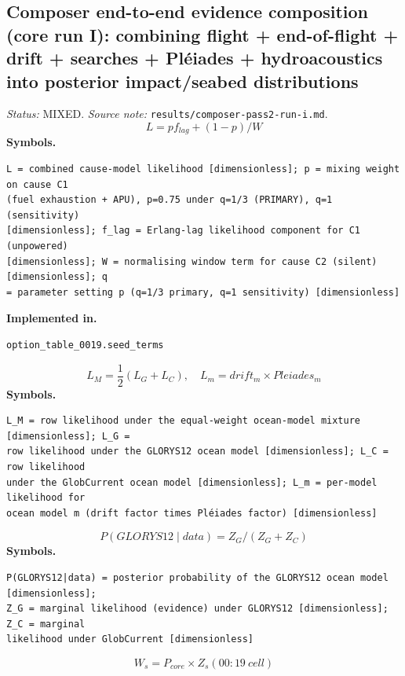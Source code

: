 \documentclass[11pt,a4paper]{article}
\begin{document}
\subsection{Composer end-to-end evidence composition (core run I): combining flight + end-of-flight + drift + searches + Pléiades + hydroacoustics into posterior impact/seabed distributions}
\noindent\textit{Status:} MIXED. \textit{Source note:} \texttt{results/composer-pass2-run-i.md}.
\medskip
\begin{equation}
L = p f_{lag} + (1-p)/W
\end{equation}
\noindent\textbf{Symbols.}
\begin{verbatim}
L = combined cause-model likelihood [dimensionless]; p = mixing weight on cause C1
(fuel exhaustion + APU), p=0.75 under q=1/3 (PRIMARY), q=1 (sensitivity)
[dimensionless]; f_lag = Erlang-lag likelihood component for C1 (unpowered)
[dimensionless]; W = normalising window term for cause C2 (silent) [dimensionless]; q
= parameter setting p (q=1/3 primary, q=1 sensitivity) [dimensionless]
\end{verbatim}
\noindent\textbf{Implemented in.}
\begin{verbatim}
option_table_0019.seed_terms
\end{verbatim}
\medskip
\begin{equation}
L_M = \frac{1}{2}(L_G + L_C),\quad L_m = drift_m \times Pleiades_m
\end{equation}
\noindent\textbf{Symbols.}
\begin{verbatim}
L_M = row likelihood under the equal-weight ocean-model mixture [dimensionless]; L_G =
row likelihood under the GLORYS12 ocean model [dimensionless]; L_C = row likelihood
under the GlobCurrent ocean model [dimensionless]; L_m = per-model likelihood for
ocean model m (drift factor times Pléiades factor) [dimensionless]
\end{verbatim}
\medskip
\begin{equation}
P(GLORYS12 \mid data) = Z_G / (Z_G + Z_C)
\end{equation}
\noindent\textbf{Symbols.}
\begin{verbatim}
P(GLORYS12|data) = posterior probability of the GLORYS12 ocean model [dimensionless];
Z_G = marginal likelihood (evidence) under GLORYS12 [dimensionless]; Z_C = marginal
likelihood under GlobCurrent [dimensionless]
\end{verbatim}
\medskip
\begin{equation}
W_s = P_{core} \times Z_s(00{:}19\ cell)
\end{equation}
\end{document}
